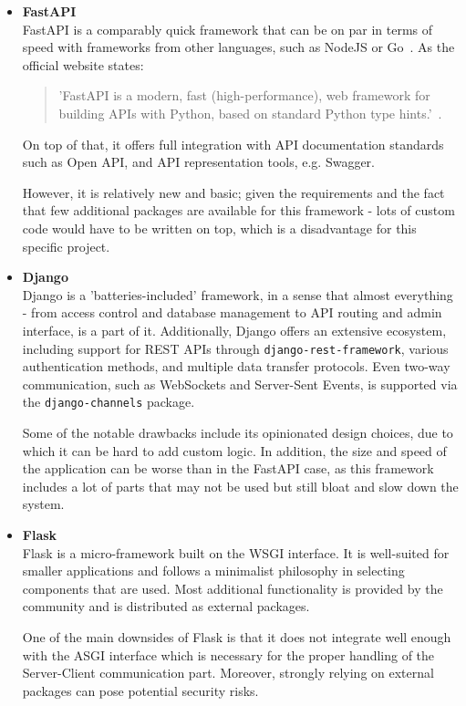 \begin{itemize}
    \item \textbf{FastAPI} \\
    FastAPI is a comparably quick framework that can be on par in terms of speed with frameworks from other languages,
    such as NodeJS or Go~\cite{fastapi}.
    As the official website states:
    \begin{quote}
        'FastAPI is a modern, fast (high-performance), web framework for building APIs
        with Python, based on standard Python type hints.'~\cite{fastapi}. \\
    \end{quote}
    On top of that, it offers full integration with API documentation standards such as
    Open API, and API representation tools, e.g. Swagger.

    However, it is relatively new and basic; given the requirements and the fact that
    few additional packages are available for this framework - lots of custom code would have
    to be written on top, which is a disadvantage for this specific project.

    \item \textbf{Django} \\
    Django is a 'batteries-included' framework, in a sense that almost everything -
    from access control and database management to API routing and admin interface,
    is a part of it.\cite{django}
    Additionally, Django offers an extensive ecosystem, including support for REST APIs through
    \texttt{django-rest-framework}\cite{drf}, various authentication methods,
    and multiple data transfer protocols. Even two-way communication, such as WebSockets and Server-Sent Events,
    is supported via the \texttt{django-channels}\cite{django_channels} package.

    Some of the notable drawbacks include its opinionated design choices, due to which it can be hard to add custom logic.
    In addition, the size and speed of the application can be worse than in the FastAPI case,
    as this framework includes a lot of parts that may not be used but still bloat and slow down the system.

    \item \textbf{Flask} \\
    Flask is a micro-framework built on the WSGI interface.
    It is well-suited for smaller applications and follows a minimalist philosophy
    in selecting components that are used.\cite{flask} Most additional functionality is provided by
    the community and is distributed as external packages.

    One of the main downsides of Flask is that it does not integrate well enough with the ASGI
    interface which is necessary for the proper handling of the Server-Client communication part.
    Moreover, strongly relying on external packages can pose potential security risks.
\end{itemize}

